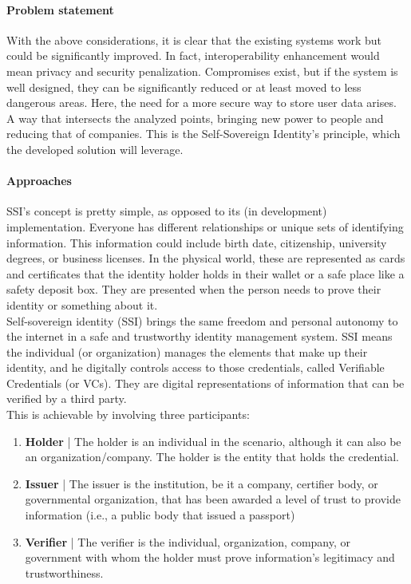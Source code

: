 \paragraph{Problem statement}
With the above considerations, it is clear that the existing systems work 
but could be significantly improved. In fact, interoperability enhancement 
would mean privacy and security penalization. Compromises exist, but if the 
system is well designed, they can be significantly reduced or at least 
moved to less dangerous areas. Here, the need for a more secure way to store
user data arises. A way that intersects the analyzed points, bringing new 
power to people and reducing that of companies. This is the Self-Sovereign 
Identity's principle, which the developed solution will leverage.

\paragraph{Approaches} SSI's concept is pretty simple, as opposed to its 
(in development) implementation. Everyone has different relationships or 
unique sets of identifying information. This information could include 
birth date, citizenship, university degrees, or business licenses. In the 
physical world, these are represented as cards and certificates that the 
identity holder holds in their wallet or a safe place like a safety deposit 
box. They are presented when the person needs to prove their identity or 
something about it.\\
Self-sovereign identity (SSI) brings the same freedom and personal autonomy
to the internet in a safe and trustworthy identity management system. 
SSI means the individual (or organization) manages the elements that make 
up their identity, and he digitally controls access to those credentials,
called Verifiable Credentials (or VCs). They are digital representations of
information that can be verified by a third party.
\vspace*{0.3cm}\\
This is achievable by involving three participants:
\begin{enumerate}
    \item \textbf{Holder} | The holder is an individual in the scenario, 
    although it can also be an organization/company. The holder is the 
    entity that holds the credential.
    \item \textbf{Issuer} | The issuer is the institution, be it a company, 
    certifier body, or governmental organization, that has been awarded a 
    level of trust to provide information (i.e., a public body that issued 
    a passport)
    \item \textbf{Verifier} | The verifier is the individual, organization,
    company, or government with whom the holder must prove information's 
    legitimacy and trustworthiness.
\end{enumerate}
